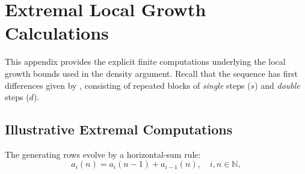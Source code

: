 \documentclass[12pt, oneside]{article}
\numberwithin{equation}{section}
\theoremstyle{definition}
\theoremstyle{plain}
\theoremstyle{remark}
\begin{document}





\newpage
\section{Extremal Local Growth Calculations}
\label{app:local-growth-details}

This appendix provides the explicit finite computations underlying the local
growth bounds used in the density argument. Recall that the sequence 
has first differences given by , consisting of repeated blocks of
\emph{single} steps ($s$) and \emph{double} steps ($d$).

\subsection{Illustrative Extremal Computations}

The generating rows evolve by a horizontal-sum rule:
\begin{equation}
a_i(n) = a_i(n-1) + a_{i-1}(n), \quad i,n \in \mathbb{N},
\end{equation}
\end{document}
